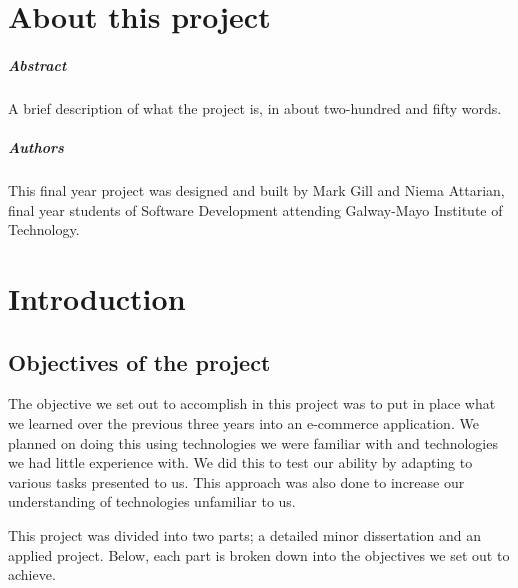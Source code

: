 
\chapter*{About this project}
\paragraph{Abstract}
A brief description of what the project is, in about two-hundred and fifty words.

\paragraph{Authors}
This final year project was designed and built by Mark Gill and Niema Attarian, final year students of Software Development attending Galway-Mayo Institute of Technology.

\chapter{Introduction}

\section{Objectives of the project}
The objective we set out to accomplish in this project was to put in place what we learned over the previous three years into an e-commerce application. We planned on doing this using technologies we were familiar with and technologies we had little experience with. We did this to test our ability by adapting to various tasks presented to us. This approach was also done to increase our understanding of technologies unfamiliar to us.

This project was divided into two parts; a detailed minor dissertation and an applied project. Below, each part is broken down into the objectives we set out to achieve.

